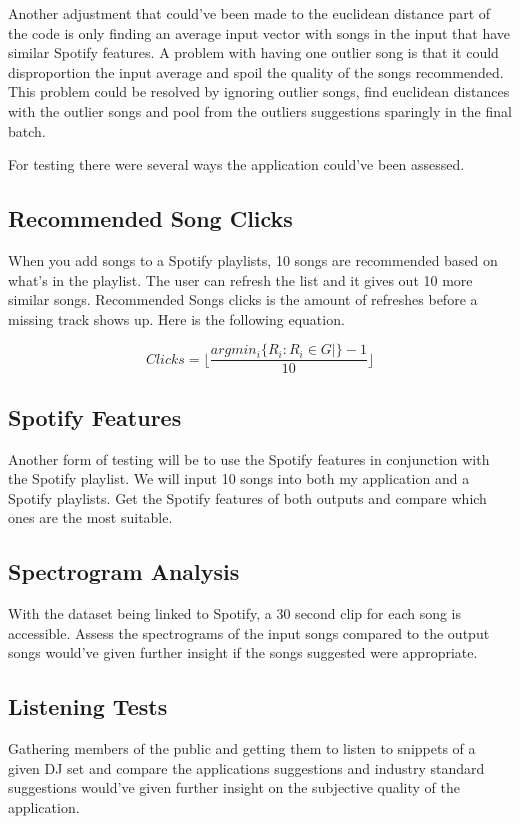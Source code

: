 Another adjustment that could've been made to the euclidean distance part of the code is only finding an average input vector with songs  in the input that have similar Spotify features. A problem with having one outlier song is that it could disproportion the input average and spoil the quality of the songs recommended. This problem could be resolved by ignoring outlier songs, find euclidean distances with the outlier songs and pool from the outliers suggestions sparingly in the final batch.

For testing there were several ways the application could've been assessed. 

\subsection{Recommended Song Clicks}
When you add songs to a Spotify playlists, 10 songs are recommended based on what's in the playlist. The user can refresh the list and it gives out 10 more similar songs. Recommended Songs clicks is the amount of refreshes before a missing track shows up. Here is the following equation.

\begin{equation}
	Clicks= \lfloor \frac {argmin_{i}  \{ R_{i} : R_{i} \in G | \} -1} { 10 } \rfloor
\end{equation}


\subsection{Spotify Features}
Another form of testing will be to use the Spotify features in conjunction with the Spotify playlist. We will input 10 songs into both my application and a Spotify playlists. Get the Spotify features of both outputs and compare which ones are the most suitable.

\subsection{Spectrogram Analysis}
With the dataset being linked to Spotify, a 30 second clip for each song is accessible. Assess the spectrograms of the input songs compared to the output songs would've given further insight if the songs suggested were appropriate.

\subsection{Listening Tests}
Gathering members of the public and getting them to listen to snippets of a given DJ set and compare the applications suggestions and industry standard suggestions would've given further insight on the subjective quality of the application.
